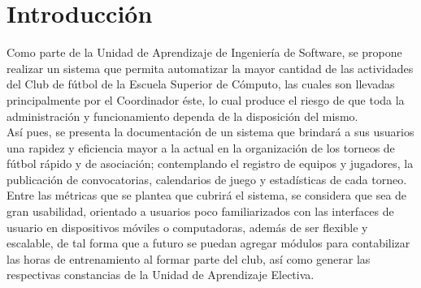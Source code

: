 \section{Introducción}

\begin{description}

\item Como parte de la Unidad de Aprendizaje de Ingeniería de Software, se propone realizar un sistema que permita automatizar la mayor cantidad de las actividades del Club de fútbol de la Escuela Superior de Cómputo, las cuales son llevadas principalmente por el Coordinador éste, lo cual produce el riesgo de que toda la administración y funcionamiento dependa de la disposición del mismo.\\
	
Así pues, se presenta la documentación de un sistema que brindará a sus usuarios una rapidez y eficiencia mayor a la actual en la organización de los torneos de fútbol rápido y de asociación; contemplando el registro de equipos y jugadores, la publicación de convocatorias, calendarios de juego y estadísticas de cada torneo.\\

Entre las métricas que se plantea que cubrirá el sistema, se considera que sea de gran usabilidad, orientado a usuarios poco familiarizados con las interfaces de usuario en dispositivos móviles o computadoras, además de ser flexible y escalable, de tal forma que a futuro se puedan agregar módulos para contabilizar las horas de entrenamiento al formar parte del club, así como generar las respectivas constancias de la Unidad de Aprendizaje Electiva.

\end{description}

